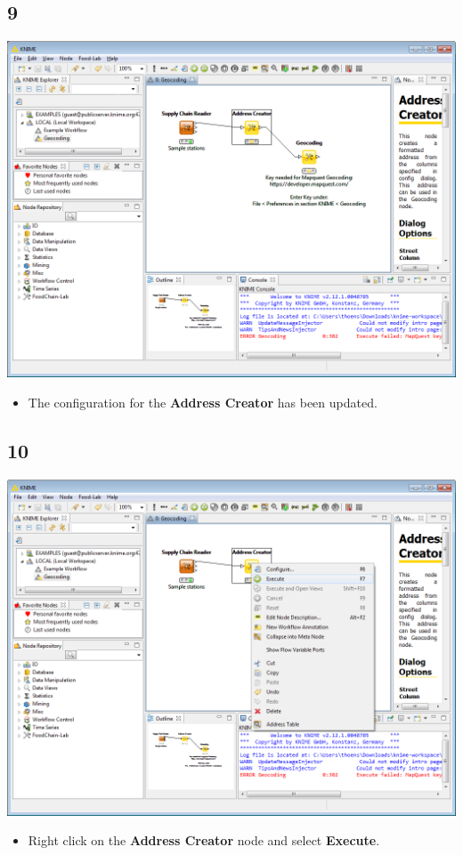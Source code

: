 \documentclass{beamer}
\begin{document}
\subsection{9}
\begin{frame}
	\begin{center}
  		\includegraphics[height=0.6\textheight]{9.png}
	\end{center}
	\begin{itemize}
		\item The configuration for the \textbf{Address Creator} has been updated.
	\end{itemize}
\end{frame}

\subsection{10}
\begin{frame}
	\begin{center}
  		\includegraphics[height=0.6\textheight]{10.png}
	\end{center}
	\begin{itemize}
		\item Right click on the \textbf{Address Creator} node and select \textbf{Execute}.
	\end{itemize}
\end{frame}
\end{document}
